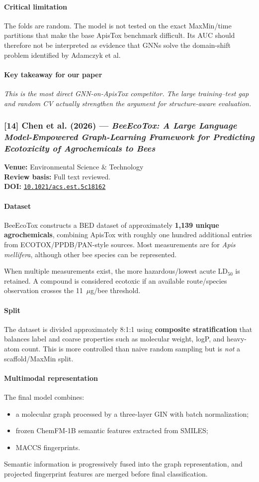 \documentclass[11pt]{article}
\newcommand{\reviewfield}[2]{\paragraph{#1}#2}
\newcommand{\keytakeaway}[1]{\paragraph{Key takeaway for our paper}\emph{#1}}
\newcommand{\paperdoi}[1]{\href{https://doi.org/#1}{\texttt{#1}}}
\begin{document}
\reviewfield{Critical limitation}{
The folds are random. The model is not tested on the exact MaxMin/time partitions that make the base ApisTox benchmark difficult. Its AUC should therefore not be interpreted as evidence that GNNs solve the domain-shift problem identified by Adamczyk et al.
}

\keytakeaway{This is the most direct GNN-on-ApisTox competitor. The large training--test gap and random CV actually strengthen the argument for structure-aware evaluation.}

\subsubsection{[14] Chen et al. (2026) --- \textit{BeeEcoTox: A Large Language Model-Empowered Graph-Learning Framework for Predicting Ecotoxicity of Agrochemicals to Bees}}
\textbf{Venue:} Environmental Science \& Technology\\
\textbf{Review basis:} Full text reviewed.\\
\textbf{DOI:} \paperdoi{10.1021/acs.est.5c18162}

\reviewfield{Dataset}{
BeeEcoTox constructs a BED dataset of approximately \textbf{1,139 unique agrochemicals}, combining ApisTox with roughly one hundred additional entries from ECOTOX/PPDB/PAN-style sources. Most measurements are for \textit{Apis mellifera}, although other bee species can be represented.

When multiple measurements exist, the more hazardous/lowest acute LD$_{50}$ is retained. A compound is considered ecotoxic if an available route/species observation crosses the 11~$\mu$g/bee threshold.
}

\reviewfield{Split}{
The dataset is divided approximately 8:1:1 using \textbf{composite stratification} that balances label and coarse properties such as molecular weight, logP, and heavy-atom count. This is more controlled than naive random sampling but is \emph{not} a scaffold/MaxMin split.
}

\reviewfield{Multimodal representation}{
The final model combines:
\begin{itemize}
    \item a molecular graph processed by a three-layer GIN with batch normalization;
    \item frozen ChemFM-1B semantic features extracted from SMILES;
    \item MACCS fingerprints.
\end{itemize}
Semantic information is progressively fused into the graph representation, and projected fingerprint features are merged before final classification.
}
\end{document}
